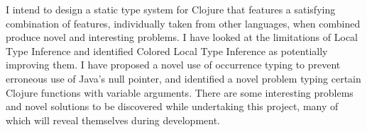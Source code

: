 \documentclass[12pt, a4paper]{article}
\begin{document}
I intend to design a static type system for Clojure
that features a satisfying combination of features, individually taken from other
languages, when combined produce novel and interesting problems.
I have looked at the limitations of Local Type Inference and identified Colored Local
Type Inference as potentially improving them.
I have proposed a novel use of occurrence typing to prevent erroneous use of Java's
null pointer, and identified a novel problem typing certain Clojure functions with variable
arguments.
There are some interesting problems and novel solutions to be discovered while undertaking this
project, many of which will reveal themselves during development.


\printbibliography
\end{document}

